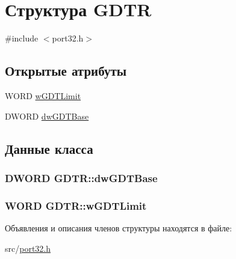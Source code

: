 \hypertarget{struct_g_d_t_r}{\section{Структура G\-D\-T\-R}
\label{struct_g_d_t_r}
}


{\ttfamily \#include $<$port32.\-h$>$}

\subsection*{Открытые атрибуты}
\begin{DoxyCompactItemize}
\item 
W\-O\-R\-D \hyperlink{struct_g_d_t_r_af940877507d655a0c92483b161001d03}{w\-G\-D\-T\-Limit}
\item 
D\-W\-O\-R\-D \hyperlink{struct_g_d_t_r_afbb4d133d27160332e7598849526e9ad}{dw\-G\-D\-T\-Base}
\end{DoxyCompactItemize}


\subsection{Данные класса}
\hypertarget{struct_g_d_t_r_afbb4d133d27160332e7598849526e9ad}{
\subsubsection[{dw\-G\-D\-T\-Base}]{\setlength{\rightskip}{0pt plus 5cm}D\-W\-O\-R\-D G\-D\-T\-R\-::dw\-G\-D\-T\-Base}}\label{struct_g_d_t_r_afbb4d133d27160332e7598849526e9ad}
\hypertarget{struct_g_d_t_r_af940877507d655a0c92483b161001d03}{
\subsubsection[{w\-G\-D\-T\-Limit}]{\setlength{\rightskip}{0pt plus 5cm}W\-O\-R\-D G\-D\-T\-R\-::w\-G\-D\-T\-Limit}}\label{struct_g_d_t_r_af940877507d655a0c92483b161001d03}


Объявления и описания членов структуры находятся в файле\-:\begin{DoxyCompactItemize}
\item 
src/\hyperlink{port32_8h}{port32.\-h}\end{DoxyCompactItemize}
